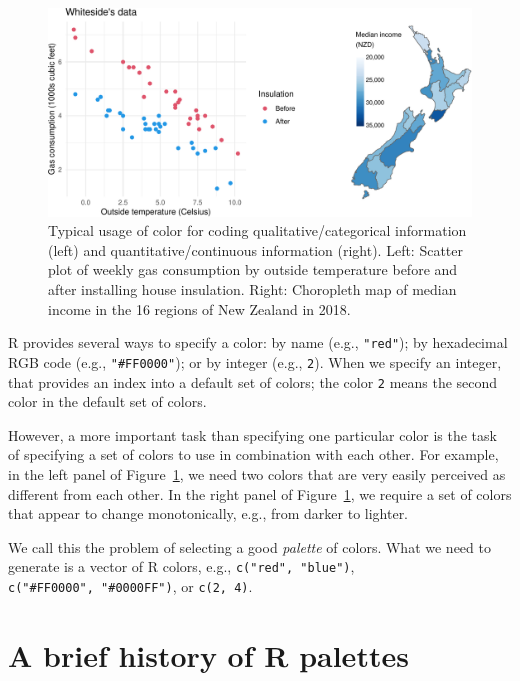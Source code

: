 \begin{figure}[h!]

{\centering \includegraphics[width=1\linewidth]{color_files/figure-latex/colorcatcont-1} 

}

\caption{Typical usage of color for coding qualitative/categorical information (left) and quantitative/continuous information (right). Left: Scatter plot of weekly gas consumption by outside temperature before and after installing house insulation. Right: Choropleth map of median income in the 16 regions of New Zealand in 2018.}\label{fig:colorcatcont}
\end{figure}

R provides several ways to specify a color: by name (e.g., \texttt{"red"});
by hexadecimal RGB code (e.g., \texttt{"\#FF0000"}); or by integer (e.g., \texttt{2}).
When we specify an integer, that provides an index into a
default set of colors; the color \texttt{2}
means the second color in the default set of colors.

However, a more important task than specifying one particular color
is the task of specifying a set of colors to use in combination
with each other.
For example, in the left panel of Figure~\ref{fig:colorcatcont},
we need two colors
that are very easily perceived as different from each other.
In the right panel of Figure~\ref{fig:colorcatcont},
we require a set of colors
that appear to change monotonically, e.g., from darker to lighter.

We call this the problem of selecting a good \emph{palette} of colors.
What we need to generate is a vector of R colors, e.g.,
\texttt{c("red",\ "blue")}, \texttt{c("\#FF0000",\ "\#0000FF")}, or \texttt{c(2,\ 4)}.

\hypertarget{a-brief-history-of-r-palettes}{%
\section{A brief history of R palettes}\label{a-brief-history-of-r-palettes}}

